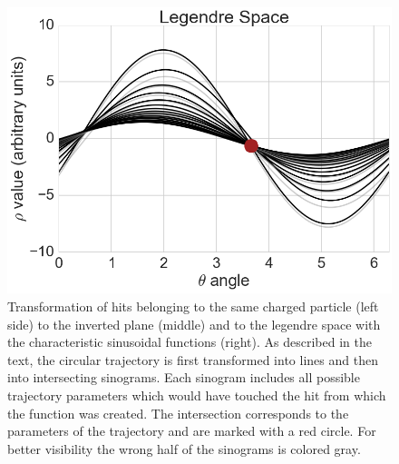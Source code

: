 \begin{figure}
 \vspace*{1cm}
 \includegraphics[scale=0.3]{figures/theory/legendre_3.png}
 \caption[Axial legendre algorithm.]{Transformation of hits belonging to the same charged particle (left side) to the inverted plane (middle) and to the legendre space with the characteristic sinusoidal functions (right). As described in the text, the circular trajectory is first transformed into lines and then into intersecting sinograms. Each sinogram includes all possible trajectory parameters which would have touched the hit from which the function was created. The intersection corresponds to the parameters of the trajectory and are marked with a red circle. For better visibility the wrong half of the sinograms is colored gray.}
 \label{fig-legendre-explained}
\end{figure}

